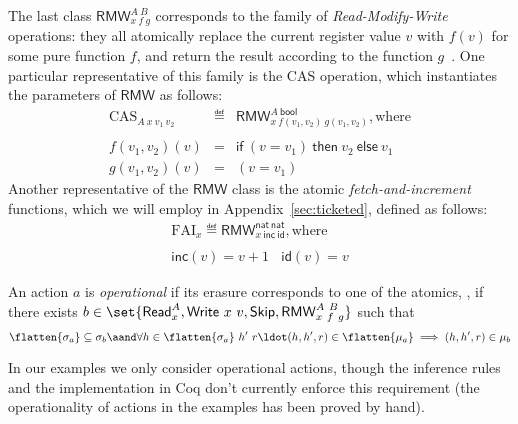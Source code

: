 The last class $\mathsf{RMW}^{A~B}_{x~f~g}$ corresponds to the family of
\emph{Read-Modify-Write} operations: they all atomically replace the
current register value $v$ with $f(v)$ for some pure function $f$, and
return the result according to the function $g$~\cite[\S
5.6]{Herlihy-Shavit:08}. One particular representative of this family
is the CAS operation, which instantiates the parameters of $\mathsf{RMW}$ as
follows:
%
{\small
\[
\begin{array}{rcl}
\text{CAS}_{A~x~v_1~v_2} & \eqdef &
\mathsf{RMW}^{A~\mathsf{bool}}_{x~f({v_1},{v_2})~g({v_1},{v_2})}, \text{where}   
\\ \\
f({v_1},{v_2})(v) & = & \mathsf{if}~ (v = v_1) ~\mathsf{then}~ v_2
~\mathsf{else}~ v_1 \\
g({v_1},{v_2})(v) & = & (v = v_1)
\end{array}
\]}
%
%
Another representative of the $\mathsf{RMW}$ class is the atomic
\emph{fetch-and-increment} functions, which we will employ in
Appendix~\ref{sec:ticketed}, defined as follows:
%
\[
\begin{array}{c}
\text{FAI}_{x} \eqdef
\mathsf{RMW}^{\mathsf{nat}~\mathsf{nat}}_{x~\mathsf{inc}~\mathsf{id}}, \text{where}   
\\ \\
\mathsf{inc} (v) =  v + 1 ~~~~
\mathsf{id} (v) = v
\end{array}
\]


\begin{definition} 
\label{def:opact}
%
An action $a$ is \emph{operational} if its erasure corresponds to one
of the atomics, \ie, if there exists $b \in \set{\mathsf{Read}^A_x, \mathsf{Write}\ x\ v, \mathsf{Skip},
\mathsf{RMW}^{A~B}_{x~f~g}}$ such that
{\small
\[
\flatten{\sigma_a} \subseteq \sigma_b \aand 
\forall h \in \flatten{\sigma_a}\ h'\ r\ldot (h, h', r) \in \flatten{\mu_a} \implies (h, h', r) \in \mu_b
\]}
\end{definition}
In our examples we only consider operational actions, though the
inference rules and the implementation in Coq don't currently enforce
this requirement (the operationality of actions in the examples has
been proved by hand).

